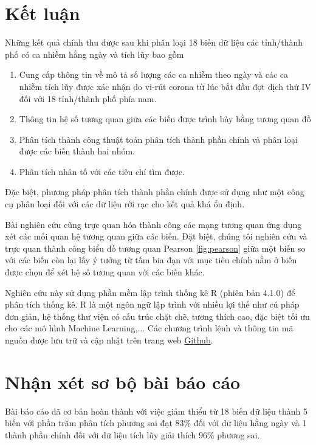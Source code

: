 \documentclass[../thesis.tex]{subfiles}
\begin{document}
\section{Kết luận}

Những kết quả chính thu được sau khi phân loại 18 biến dữ liệu các tỉnh/thành phố có ca nhiễm hằng ngày và tích lũy bao gồm
\begin{enumerate}
	\item Cung cấp thông tin về mô tả số lượng các ca nhiễm theo ngày và các ca nhiễm tích lũy được xác nhận do vi-rút corona từ lúc bắt đầu đợt dịch thứ IV đối với 18 tỉnh/thành phố phía nam.
	\item Thông tin hệ số tương quan giữa các biến được trình bày bằng tương quan đồ
	\item Phân tích thành công thuật toán phân tích thành phần chính và phân loại được các biến thành hai nhóm.
	\item Phân tích nhân tố với các tiêu chí tìm được.
\end{enumerate}

Đặc biệt, phương pháp phân tích thành phần chính được sử dụng như một công cụ phân loại đối với các dữ liệu rời rạc cho kết quả khá ổn định.

Bài nghiên cứu cũng trực quan hóa thành công các mạng tương quan ứng dụng xét các mối quan hệ tương quan giữa các biến. Đặt biệt, chúng tôi nghiên cứu và trực quan thành công biểu đồ tương quan Pearson \ref{fig:pearson} giữa một biến so với các biến còn lại lấy ý tưởng từ tấm bia đạn với mục tiêu chính nằm ở biến được chọn để xét hệ số tương quan với các biến khác. 

Nghiên cứu này sử dụng phần mềm lập trình thống kê R (phiên bản 4.1.0) để phân tích thống kê. R là một ngôn ngữ lập trình với nhiều lợi thế như cú pháp đơn giản, hệ thống thư viện có cấu trúc chặt chẽ, tương thích cao, đặc biệt tối ưu cho các mô hình Machine Learning,$\ldots$ Các chương trình lệnh và thông tin mã nguồn được lưu trữ và cập nhật trên trang web \href{https://github.com/hungtrannam/PCA_For_Covid-19}{Github}.

\section{Nhận xét sơ bộ bài báo cáo}

Bài báo cáo đã cơ bản hoàn thành với việc giảm thiểu từ 18 biến dữ liệu thành 5 biến với phần trăm phân tích phương sai đạt $ 83\% $ đối với dữ liệu hằng ngày và 1 thành phần chính đối với dữ liệu tích lũy giải thích $ 96\% $ phương sai.
\end{document}
